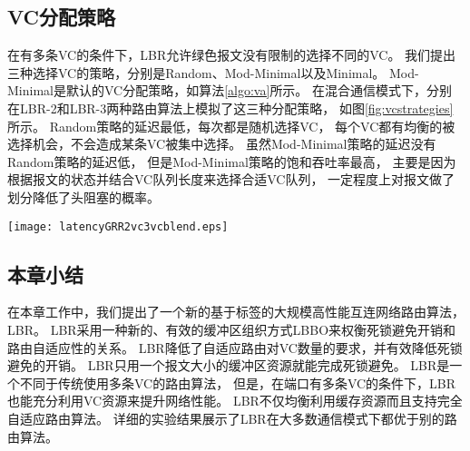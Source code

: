 \subsection{VC分配策略}

在有多条VC的条件下，LBR允许绿色报文没有限制的选择不同的VC。
我们提出三种选择VC的策略，分别是Random、Mod-Minimal以及Minimal。
Mod-Minimal是默认的VC分配策略，如算法\ref{algo:va}所示。
在混合通信模式下，分别在LBR-2和LBR-3两种路由算法上模拟了这三种分配策略，
如图\ref{fig:vcstrategies}所示。
Random策略的延迟最低，每次都是随机选择VC，
每个VC都有均衡的被选择机会，不会造成某条VC被集中选择。
虽然Mod-Minimal策略的延迟没有Random策略的延迟低，
但是Mod-Minimal策略的饱和吞吐率最高，
主要是因为根据报文的状态并结合VC队列长度来选择合适VC队列，
一定程度上对报文做了划分降低了头阻塞的概率。

\begin{figure*}[t]
  \centering
  \texttt{[image: latencyGRR2vc3vcblend.eps]}
  \caption{混合通信模式下VC分配策略性能比较}
  \label{fig:vcstrategies}
\end{figure*}

\subsection{本章小结}

在本章工作中，我们提出了一个新的基于标签的大规模高性能互连网络路由算法，LBR。
LBR采用一种新的、有效的缓冲区组织方式LBBO来权衡死锁避免开销和路由自适应性的关系。
LBR降低了自适应路由对VC数量的要求，并有效降低死锁避免的开销。
LBR只用一个报文大小的缓冲区资源就能完成死锁避免。
LBR是一个不同于传统使用多条VC的路由算法，
但是，在端口有多条VC的条件下，LBR也能充分利用VC资源来提升网络性能。
LBR不仅均衡利用缓存资源而且支持完全自适应路由算法。
详细的实验结果展示了LBR在大多数通信模式下都优于别的路由算法。

